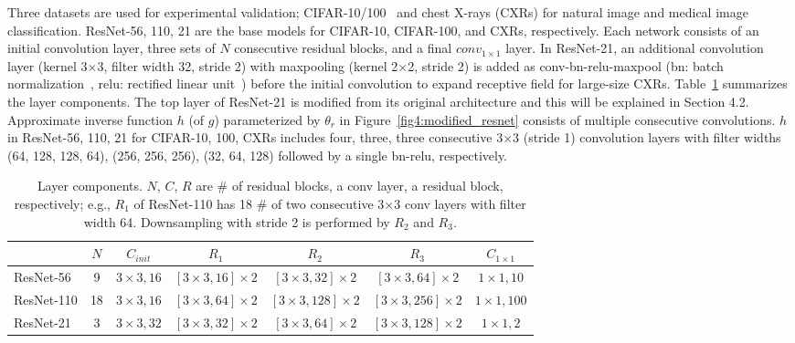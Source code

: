 \documentclass[runningheads,a4paper]{llncs}
\begin{document}
Three datasets are used for experimental validation; CIFAR-10/100~\cite{r14_cifar_UT2009} and chest X-rays (CXRs) for natural image and medical image classification. ResNet-56, 110, 21 are the base models for CIFAR-10, CIFAR-100, and CXRs, respectively. Each network consists of an initial convolution layer, three sets of $N$ consecutive residual blocks, and a final $conv_{1\times1}$ layer. In ResNet-21, an additional convolution layer (kernel 3$\times$3, filter width 32, stride 2) with maxpooling (kernel 2$\times$2, stride 2) is added as conv-bn-relu-maxpool (bn: batch normalization~\cite{r17_bn_icml2015}, relu: rectified linear unit~\cite{r05_alexnet_nips2012}) before the initial convolution to expand receptive field for large-size CXRs. Table~\ref{table1:resnet} summarizes the layer components. The top layer of ResNet-21 is modified from its original architecture and this will be explained in Section 4.2. Approximate inverse function $h$ (of $g$) parameterized by $\theta_{r}$ in Figure~\ref{fig4:modified_resnet} consists of multiple consecutive convolutions. $h$ in ResNet-56, 110, 21 for CIFAR-10, 100, CXRs includes four, three, three consecutive 3$\times$3 (stride 1) convolution layers with filter widths (64, 128, 128, 64), (256, 256, 256), (32, 64, 128) followed by a single bn-relu, respectively.

\setlength{\tabcolsep}{5pt}
\begin{table}[t]
\caption{Layer components. $N$, $C$, $R$ are \# of residual blocks, a conv layer, a residual block, respectively; e.g., $R_1$ of ResNet-110 has 18 \# of two consecutive 3$\times$3 conv layers with filter width 64. Downsampling with stride 2 is performed by $R_2$ and $R_3$.}
\label{table1:resnet}
\def\arraystretch{1.3}
\begin{center}\tiny
	\begin{tabular}{ l | c c c c c c}
	\hline
							& $N$ 	& $C_{init}$		& $R_1$						& $R_2$							& $R_3$							& $C_{1\times1}$ 	\\
	\hline
	ResNet-56		& 9		& $3 \times 3, 16$			& $\left[3 \times 3, 16\right] \times 2$ 	& $\left[3 \times 3, 32\right] \times 2$		& $\left[3 \times 3, 64\right] \times 2$		& $1 \times 1, 10$		\\
	ResNet-110		& 18		& $3 \times 3, 16$			& $\left[3 \times 3, 64\right] \times 2$ 	& $\left[3 \times 3, 128\right] \times 2$		& $\left[3 \times 3, 256\right] \times 2$		& $1 \times 1, 100$	\\
	ResNet-21		& 3		& $3 \times 3, 32$			& $\left[3 \times 3, 32\right] \times 2$ 	& $\left[3 \times 3, 64\right] \times 2$		& $\left[3 \times 3, 128\right] \times 2$		& $1 \times 1, 2$		\\
	\hline
	\end{tabular}
\end{center}
\end{table}
\end{document}
